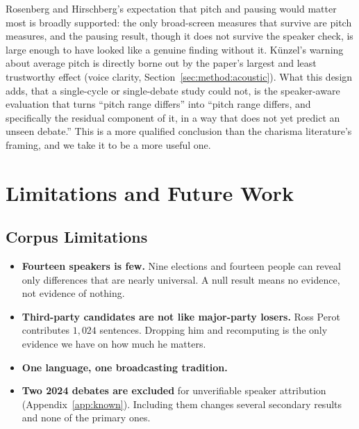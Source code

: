 \documentclass[journal]{IEEEtran}
\begin{document}
Rosenberg and Hirschberg's \cite{rosenberg2009acoustic} expectation that
pitch and pausing would matter most is broadly supported: the only
broad-screen measures that survive are pitch measures, and the pausing
result, though it does not survive the speaker check, is large enough to
have looked like a genuine finding without it. K\"unzel's
\cite{kunzel1989speakers} warning about average pitch is directly borne out
by the paper's largest and least trustworthy effect (voice clarity,
Section~\ref{sec:method:acoustic}). What this design adds, that a
single-cycle or single-debate study could not, is the speaker-aware
evaluation that turns ``pitch range differs'' into ``pitch range differs,
and specifically the residual component of it, in a way that does not yet
predict an unseen debate.'' This is a more qualified conclusion than the
charisma literature's framing, and we take it to be a more useful one.

\section{Limitations and Future Work}
\label{sec:concl:limits}

\subsection{Corpus Limitations}
\begin{itemize}\itemsep2pt
  \item \textbf{Fourteen speakers is few.} Nine elections and fourteen
        people can reveal only differences that are nearly universal. A
        null result means no evidence, not evidence of nothing.
  \item \textbf{Third-party candidates are not like major-party losers.}
        Ross Perot contributes $1{,}024$ sentences. Dropping him and
        recomputing is the only evidence we have on how much he matters.
  \item \textbf{One language, one broadcasting tradition.}
  \item \textbf{Two 2024 debates are excluded} for unverifiable speaker
        attribution (Appendix~\ref{app:known}). Including them changes
        several secondary results and none of the primary ones.
\end{itemize}
\end{document}
